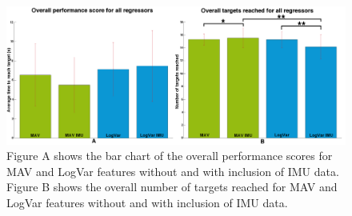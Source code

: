 \begin{figure}[H]
	\centering
	\includegraphics[width=1\textwidth]{figures/paperFigures/allRegressorBarzTimeScoreForTargetTestCol}  %
	\caption{Figure A shows the bar chart of the overall performance scores for MAV and LogVar features without and with inclusion of IMU data. Figure B shows the overall number of targets reached for MAV and LogVar features without and with inclusion of IMU data.}
	\label{fig:TargetScoresTargetsCol}  %
\end{figure}
